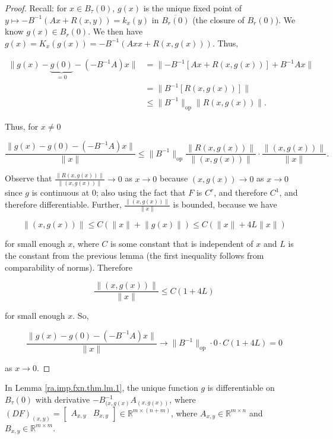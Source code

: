 \begin{proof}

Recall: for \(x \in B_\tau(0)\), \(g(x) \) is the unique fixed point of \(y \mapsto -B^{-1}(Ax + R(x,y)) = k_x(y)\) in \(\overline{B_r(0)}\) (the closure of \(B_r(0)\)). We know \(g(x) \in B_r(0)\). We then have \(g(x) = K_x(g(x)) = -B^{-1}(Axx + R(x, g(x)))\). Thus, 

\begin{align*} 
\lVert g(x) - \underbrace{g(0)}_{=0} - (-B^{-1}A)x \rVert & = \lVert -B^{-1}\left[Ax + R(x, g(x)) \right] + B^{-1}Ax \rVert
\\ & = \lVert B^{-1} \left[ R(x, g(x)) \right] \rVert
\\ & \leq \lVert B^{-1} \rVert_{\text{op}} \lVert R (x, g(x)) \rVert.
\end{align*}

Thus, for \(x \neq 0\)

\[
\frac{  \lVert g(x) - g(0) - (-B^{-1}A)x \rVert}{ \lVert x \rVert} \leq \lVert B^{-1} \rVert_{\text{op}} \frac{ \lVert R(x, g(x)) \rVert}{ \lVert (x, g(x)) \rVert } \cdot \frac{ \lVert (x, g(x)) \rVert}{ \lVert x \rVert}.
\]

Observe that \(\frac{ \lVert R(x, g(x)) \rVert}{ \lVert (x, g(x)) \rVert } \to 0\) as \(x \to 0\) because \((x, g(x)) \to 0\) as \(x \to 0\) since \(g\) is continuous at 0; also using the fact that \(F\) is \(C^r\), and therefore \(C^1\), and therefore differentiable. Further, \(\frac{ \lVert (x, g(x)) \rVert}{ \lVert x \rVert}\) is bounded, because we have

\[
\lVert (x, g(x)) \rVert \leq C ( \lVert x \rVert + \lVert g(x) \rVert) \leq  C(\lVert x \rVert + 4 L \lVert x \rVert)
\]

for small enough \(x\), where \(C\) is some constant that is independent of \(x\) and \(L\) is the constant from the previous lemma (the first inequality follows from comparability of norms). Therefore

\[
\frac{ \lVert (x, g(x)) \rVert}{ \lVert x \rVert} \leq C(1 + 4L)
\]

for small enough \(x\). So, 

\[
\frac{  \lVert g(x) - g(0) - (-B^{-1}A)x \rVert}{ \lVert x \rVert} \to \lVert B^{-1} \rVert_{\text{op}} \cdot 0 \cdot C(1 + 4L) = 0
\]

as \(x \to 0\).

\end{proof}

\begin{lemma}

In Lemma \ref{ra.imp.fxn.thm.lm.1}, the unique function \(g\) is differentiable on \(B_\tau(0)\) with derivative \(-B_{(x, g(x)}^{-1} A_{(x, g(x))}\), where \((DF)_{(x,y)} = \begin{bmatrix} A_{x,y} & B_{x,y} \end{bmatrix} \in \mathbb{R}^{m \times (n+m)}\), where \(A_{x,y} \in \mathbb{R}^{m \times n}\) and \(B_{x,y} \in \mathbb{R}^{m \times m}\).

\end{lemma}

